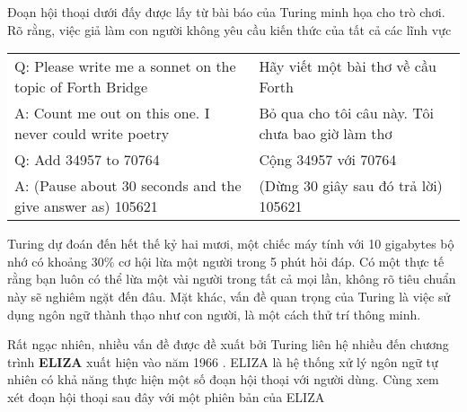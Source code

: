 Đoạn hội thoại dưới đấy được lấy từ bài báo của Turing minh họa cho trò chơi. Rõ rằng, việc giả làm con người không yêu cầu kiến thức của tất cả các lĩnh vực

\vspace{1em}
\hspace*{-6em}
\colorbox{background}{
\begin{tabular}{ l | l}
  Q: Please write me a sonnet on the topic of Forth Bridge  & Hãy viết một bài thơ về cầu Forth \\
  A: Count me out on this one. I never could write poetry & Bỏ qua cho tôi câu này. Tôi chưa bao giờ làm thơ \\
  Q: Add 34957 to 70764 & Cộng 34957 với 70764\\
  A: (Pause about 30 seconds and the give answer as) 105621 & (Dừng 30 giây sau đó trả lời) 105621 \\
\end{tabular}
}

Turing dự đoán đến hết thế kỷ hai mươi, một chiếc máy tính với 10 gigabytes bộ nhớ có khoảng 30\% cơ hội lừa một người trong 5 phút hỏi đáp. Có một thực tế rằng bạn luôn có thể lừa một vài người trong tất cả mọi lần, không rõ tiêu chuẩn này sẽ nghiêm ngặt đến đâu. Mặt khác, vấn đề quan trọng của Turing là việc sử dụng ngôn ngữ thành thạo như con người, là một cách thử trí thông minh.

Rất ngạc nhiên, nhiều vấn đề được đề xuất bởi Turing liên hệ nhiều đến chương trình \textbf{ELIZA} xuất hiện vào năm 1966 \citep{Weizenbaum:1966:ECP:365153.365168}. ELIZA là hệ thống xử lý ngôn ngữ tự nhiên có khả năng thực hiện một số đoạn hội thoại với người dùng. Cùng xem xét đoạn hội thoại sau đây với một phiên bản của ELIZA

